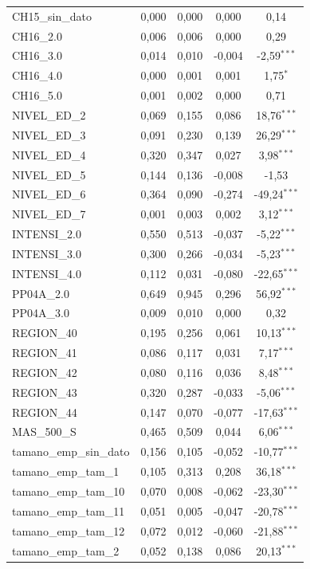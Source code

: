 \begin{table}[H]
\begin{tabular}{lcccc}
CH15\_sin\_dato & 0,000 & 0,000 & 0,000 & 0,14 \\
CH16\_2.0 & 0,006 & 0,006 & 0,000 & 0,29 \\
CH16\_3.0 & 0,014 & 0,010 & -0,004 & -2,59$^{***}$ \\
CH16\_4.0 & 0,000 & 0,001 & 0,001 & 1,75$^{*}$ \\
CH16\_5.0 & 0,001 & 0,002 & 0,000 & 0,71 \\
NIVEL\_ED\_2 & 0,069 & 0,155 & 0,086 & 18,76$^{***}$ \\
NIVEL\_ED\_3 & 0,091 & 0,230 & 0,139 & 26,29$^{***}$ \\
NIVEL\_ED\_4 & 0,320 & 0,347 & 0,027 & 3,98$^{***}$ \\
NIVEL\_ED\_5 & 0,144 & 0,136 & -0,008 & -1,53 \\
NIVEL\_ED\_6 & 0,364 & 0,090 & -0,274 & -49,24$^{***}$ \\
NIVEL\_ED\_7 & 0,001 & 0,003 & 0,002 & 3,12$^{***}$ \\
INTENSI\_2.0 & 0,550 & 0,513 & -0,037 & -5,22$^{***}$ \\
INTENSI\_3.0 & 0,300 & 0,266 & -0,034 & -5,23$^{***}$ \\
INTENSI\_4.0 & 0,112 & 0,031 & -0,080 & -22,65$^{***}$ \\
PP04A\_2.0 & 0,649 & 0,945 & 0,296 & 56,92$^{***}$ \\
PP04A\_3.0 & 0,009 & 0,010 & 0,000 & 0,32 \\
REGION\_40 & 0,195 & 0,256 & 0,061 & 10,13$^{***}$ \\
REGION\_41 & 0,086 & 0,117 & 0,031 & 7,17$^{***}$ \\
REGION\_42 & 0,080 & 0,116 & 0,036 & 8,48$^{***}$ \\
REGION\_43 & 0,320 & 0,287 & -0,033 & -5,06$^{***}$ \\
REGION\_44 & 0,147 & 0,070 & -0,077 & -17,63$^{***}$ \\
MAS\_500\_S & 0,465 & 0,509 & 0,044 & 6,06$^{***}$ \\
tamano\_emp\_sin\_dato & 0,156 & 0,105 & -0,052 & -10,77$^{***}$ \\
tamano\_emp\_tam\_1 & 0,105 & 0,313 & 0,208 & 36,18$^{***}$ \\
tamano\_emp\_tam\_10 & 0,070 & 0,008 & -0,062 & -23,30$^{***}$ \\
tamano\_emp\_tam\_11 & 0,051 & 0,005 & -0,047 & -20,78$^{***}$ \\
tamano\_emp\_tam\_12 & 0,072 & 0,012 & -0,060 & -21,88$^{***}$ \\
tamano\_emp\_tam\_2 & 0,052 & 0,138 & 0,086 & 20,13$^{***}$ \\

\end{tabular}
\end{table}
